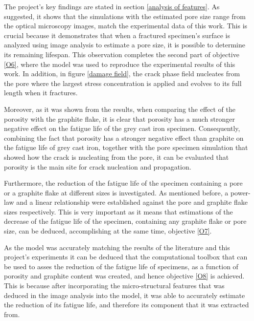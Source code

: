\documentclass[11pt,a4paper]{article}
\begin{document}
\noindent The project's key findings are stated in section \ref{analysis of features}. As suggested, it shows that the simulations with the estimated pore size range from the optical microscopy images, match the experimental data of this work. This is crucial because it demonstrates that when a fractured specimen's surface is analyzed using image analysis to estimate a pore size, it is possible to determine its remaining lifespan. This observation completes the second part of objective \ref{O6}, where the model was used to reproduce the experimental results of this work. In addition, in figure \ref{damage field}, the crack phase field nucleates from the pore where the largest stress concentration is applied and evolves to its full length when it fractures.

\noindent Moreover, as it was shown from the results, when comparing the effect of the porosity with the graphite flake, it is clear that porosity has a much stronger negative effect on the fatigue life of the grey cast iron specimen. Consequently, combining the fact that porosity has a stronger negative effect than graphite on the fatigue life of grey cast iron, together with the pore specimen simulation that showed how the crack is nucleating from the pore, it can be evaluated that porosity is the main site for crack nucleation and propagation.

\noindent Furthermore, the reduction of the fatigue life of the specimen containing a pore or a graphite flake at different sizes is investigated. As mentioned before, a power-law and a linear relationship were established against the pore and graphite flake sizes respectively. This is very important as it means that estimations of the decrease of the fatigue life of the specimen, containing any graphite flake or pore size, can be deduced, accomplishing at the same time, objective \ref{O7}.

\noindent As the model was accurately matching the results of the literature and this project's experiments it can be deduced that the computational toolbox that can be used to asses the reduction of the fatigue life of specimens, as a function of porosity and graphite content was created, and hence objective \ref{O8} is achieved. This is because after incorporating the micro-structural features that was deduced in the image analysis into the model, it was able to accurately estimate the reduction of its fatigue life, and therefore its component that it was extracted from.
\end{document}
